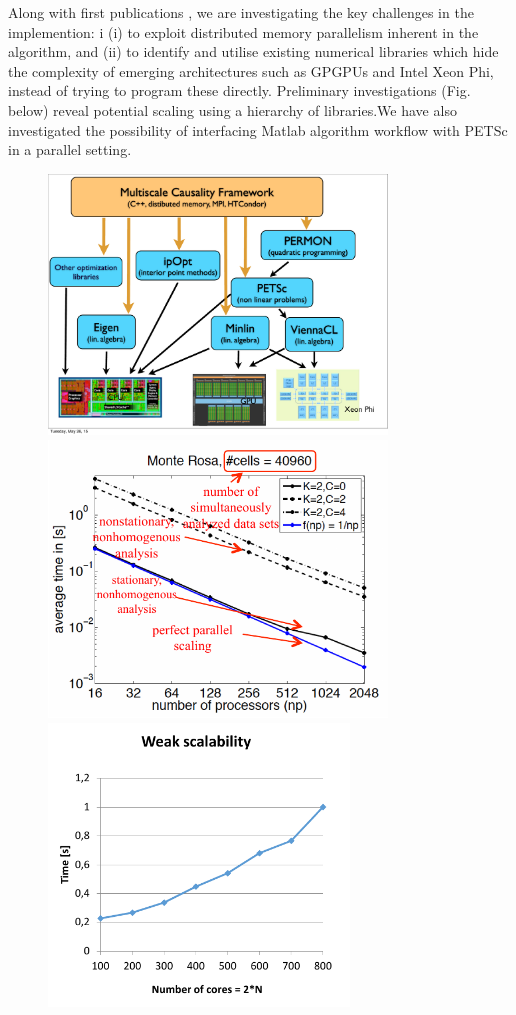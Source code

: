 \documentclass[a0,portrait]{a0poster}
\begin{document}
\begin{multicols}{2}
\vspace{-0.5cm}
\noindent

{\large Along with first publications \cite{horenko_pnas_2014,gagliardini_econometrica_2015}, we are investigating the key challenges in the implemention: i (i) to exploit distributed memory parallelism inherent in the algorithm, and (ii) to identify and utilise existing numerical libraries which hide the complexity of emerging architectures such as GPGPUs and Intel Xeon Phi, instead of trying to program these directly.  Preliminary investigations (Fig. below) reveal potential scaling using a hierarchy of libraries.We have also investigated the possibility of interfacing Matlab algorithm workflow with PETSc in a parallel setting.}

\begin{figure}[H]
\begin{center} \centerline{
\includegraphics[width=9cm]{Library_Hierarchy.pdf}
\includegraphics[width=9cm]{Scaling.pdf}
\includegraphics[width=8cm]{FLLOP_weak_scalability.pdf}
}
\end{center}
\end{figure}
\end{multicols}
\end{document}
